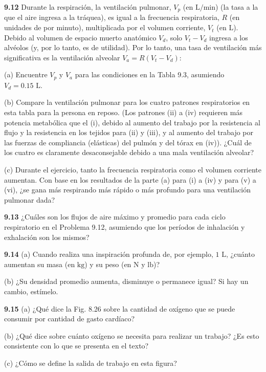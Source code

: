 \documentclass[12pt]{book}
\begin{document}
\noindent \textbf{9.12} Durante la respiración, la ventilación pulmonar, $V_p$ (en $\text{L/min}$) (la tasa a la que el aire ingresa a la tráquea), es igual a la frecuencia respiratoria, $R$ (en unidades de por minuto), multiplicada por el volumen corriente, $V_t$ (en $\text{L}$). Debido al volumen de espacio muerto anatómico $V_d$, solo $V_t - V_d$ ingresa a los alvéolos (y, por lo tanto, es de utilidad). Por lo tanto, una tasa de ventilación más significativa es la ventilación alveolar $V_a = R(V_t - V_d)$:
\par\noindent (a) Encuentre $V_p$ y $V_a$ para las condiciones en la Tabla 9.3, asumiendo $V_d = 0.15\text{ L}$.
\par\noindent (b) Compare la ventilación pulmonar para los cuatro patrones respiratorios en esta tabla para la persona en reposo. (Los patrones (ii) a (iv) requieren más potencia metabólica que el (i), debido al aumento del trabajo por la resistencia al flujo y la resistencia en los tejidos para (ii) y (iii), y al aumento del trabajo por las fuerzas de compliancia (elásticas) del pulmón y del tórax en (iv)). ¿Cuál de los cuatro es claramente desaconsejable debido a una mala ventilación alveolar?
\par\noindent (c) Durante el ejercicio, tanto la frecuencia respiratoria como el volumen corriente aumentan. Con base en los resultados de la parte (a) para (i) a (iv) y para (v) a (vi), ¿se gana más respirando más rápido o más profundo para una ventilación pulmonar dada?

\noindent \textbf{9.13} ¿Cuáles son los flujos de aire máximo y promedio para cada ciclo respiratorio en el Problema 9.12, asumiendo que los períodos de inhalación y exhalación son los mismos?

\noindent \textbf{9.14} (a) Cuando realiza una inspiración profunda de, por ejemplo, $1\text{ L}$, ¿cuánto aumentan su masa (en $\text{kg}$) y su peso (en $\text{N}$ y $\text{lb}$)?
\par\noindent (b) ¿Su densidad promedio aumenta, disminuye o permanece igual? Si hay un cambio, estímelo.

\noindent \textbf{9.15} (a) ¿Qué dice la Fig. 8.26 sobre la cantidad de oxígeno que se puede consumir por cantidad de gasto cardíaco?
\par\noindent (b) ¿Qué dice sobre cuánto oxígeno se necesita para realizar un trabajo? ¿Es esto consistente con lo que se presenta en el texto?
\par\noindent (c) ¿Cómo se define la salida de trabajo en esta figura?
\end{document}
